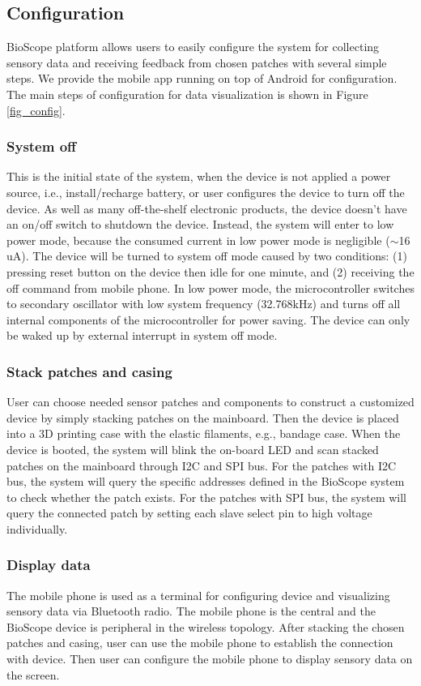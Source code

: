 \subsection{Configuration}
BioScope platform allows users to easily configure the system for collecting sensory data and receiving feedback from chosen patches with several simple steps. We provide the mobile app running on top of Android for configuration. 
The main steps of configuration for data visualization is shown in Figure \ref{fig_config}. 

\subsubsection{System off} 
This is the initial state of the system, when the device is not applied a power source, i.e., install/recharge battery, or user configures the device to turn off the device.
As well as many off-the-shelf electronic products, the device doesn't have an on/off switch to shutdown the device. 
Instead, the system will enter to low power mode, because the consumed current in low power mode is negligible ($\sim$16 uA). 
The device will be turned to system off mode caused by two conditions: (1) pressing reset button on the device then idle for one minute, and (2) receiving the off command from mobile phone.
In low power mode, the microcontroller switches to secondary oscillator with low system frequency (32.768kHz) and turns off all internal components of the microcontroller for power saving. The device can only be waked up by external interrupt in system off mode.

\subsubsection{Stack patches and casing} 
User can choose needed sensor patches and components to construct a customized device by simply stacking patches on the mainboard. Then the device is placed into a 3D printing case with the elastic filaments, e.g., bandage case.
When the device is booted, the system will blink the on-board LED and scan stacked patches on the mainboard through I2C and SPI bus. For the patches with I2C bus, the system will query the specific addresses defined in the BioScope system to check whether the patch exists. For the patches with SPI bus, the system will query the connected patch by setting each slave select pin to high voltage individually.

\subsubsection{Display data}
The mobile phone is used as a terminal for configuring device and visualizing sensory data via Bluetooth radio.
The mobile phone is the central and the BioScope device is peripheral in the wireless topology.
After stacking the chosen patches and casing, user can use the mobile phone to establish the connection with device.
Then user can configure the mobile phone to display sensory data on the screen.

